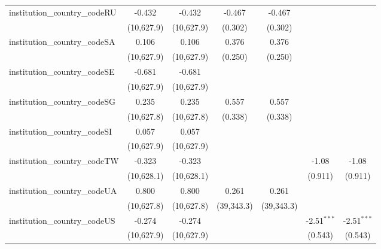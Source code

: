 \begin{tabular}{lcccccc}
   institution\_country\_codeRU          & -0.432        & -0.432        & -0.467        & -0.467        &               &   \\   
                                         & (10,627.9)    & (10,627.9)    & (0.302)       & (0.302)       &               &   \\   
   institution\_country\_codeSA          & 0.106         & 0.106         & 0.376         & 0.376         &               &   \\   
                                         & (10,627.9)    & (10,627.9)    & (0.250)       & (0.250)       &               &   \\   
   institution\_country\_codeSE          & -0.681        & -0.681        &               &               &               &   \\   
                                         & (10,627.9)    & (10,627.9)    &               &               &               &   \\   
   institution\_country\_codeSG          & 0.235         & 0.235         & 0.557         & 0.557         &               &   \\   
                                         & (10,627.8)    & (10,627.8)    & (0.338)       & (0.338)       &               &   \\   
   institution\_country\_codeSI          & 0.057         & 0.057         &               &               &               &   \\   
                                         & (10,627.9)    & (10,627.9)    &               &               &               &   \\   
   institution\_country\_codeTW          & -0.323        & -0.323        &               &               & -1.08         & -1.08\\   
                                         & (10,628.1)    & (10,628.1)    &               &               & (0.911)       & (0.911)\\   
   institution\_country\_codeUA          & 0.800         & 0.800         & 0.261         & 0.261         &               &   \\   
                                         & (10,627.8)    & (10,627.8)    & (39,343.3)    & (39,343.3)    &               &   \\   
   institution\_country\_codeUS          & -0.274        & -0.274        &               &               & -2.51$^{***}$ & -2.51$^{***}$\\   
                                         & (10,627.9)    & (10,627.9)    &               &               & (0.543)       & (0.543)\\   

\end{tabular}

